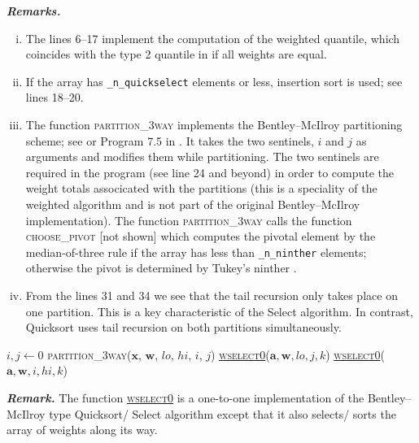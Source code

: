 \documentclass[a4paper,oneside,11pt,DIV=12]{scrartcl}
\newcommand{\code}[1]{{\texttt{#1}}}
\begin{document}
\vspace{1em}
\noindent\textbf{\sffamily \small \itshape Remarks.}
\begin{enumerate}[i)]
	\item The lines 6--17 implement the computation of the weighted quantile,
		which coincides with the type 2 quantile in \citet{hyndman_fan_1996}
		if all weights are equal.
	\item If the array has \code{\_n\_quickselect} elements or less,
		insertion sort is used; see lines 18--20.
	\item The function \textsc{partition\_3way} implements the
		Bentley--McIlroy partitioning scheme; see \citet{bentley_mcilroy_1993}
		or Program 7.5 in \citet[][p. 326]{sedgewick_1997}. It takes the
		two sentinels, $i$ and $j$ as arguments and modifies them while
		partitioning. The two sentinels are required in the program (see
		line 24 and beyond) in order to compute the weight totals
		associcated with the partitions (this is a speciality of the
		weighted algorithm and is not part of the original Bentley--McIlroy
		implementation). The function \textsc{partition\_3way} calls the
		function \textsc{choose\_pivot} [not shown] which computes the
		pivotal element by the median-of-three rule
		\citep[see e.g.][Chap. 7.5]{sedgewick_1997} if the array has less
		than \code{\_n\_ninther} elements; otherwise the pivot is
		determined by Tukey's ninther \citep[][cf.]{bentley_mcilroy_1993}.
	\item From the lines 31 and 34 we see that the tail recursion only
		takes place on one partition. This is a key characteristic of the
		Select algorithm. In contrast, Quicksort uses tail recursion on
		both partitions simultaneously.
\end{enumerate}

\begin{algorithmic}[1]
	\hypertarget{alg:wselect0}{}
			\State \Return
		\EndIf
		\State $i,j \gets 0$
		\State \textsc{partition\_3way($\bm x$, $\bm w$, $lo$, $hi$, $i$, $j$)}
			\State \hyperlink{alg:wselect0}{\textsc{wselect0}}($\bm a,
				\bm w, lo, j, k$)
			\State \hyperlink{alg:wselect0}{\textsc{wselect0}}($\bm a,
				\bm w, i, hi, k$)
		\EndIf
	\EndFunction
\end{algorithmic}

\vspace{1em}
\noindent\textbf{\sffamily \small \itshape Remark.} The function
\hyperlink{alg:wselect0}{\textsc{wselect0}} is a one-to-one implementation
of the Bentley--McIlroy type Quicksort/ Select algorithm except that it
also selects/ sorts the array of weights along its way.
\end{document}
